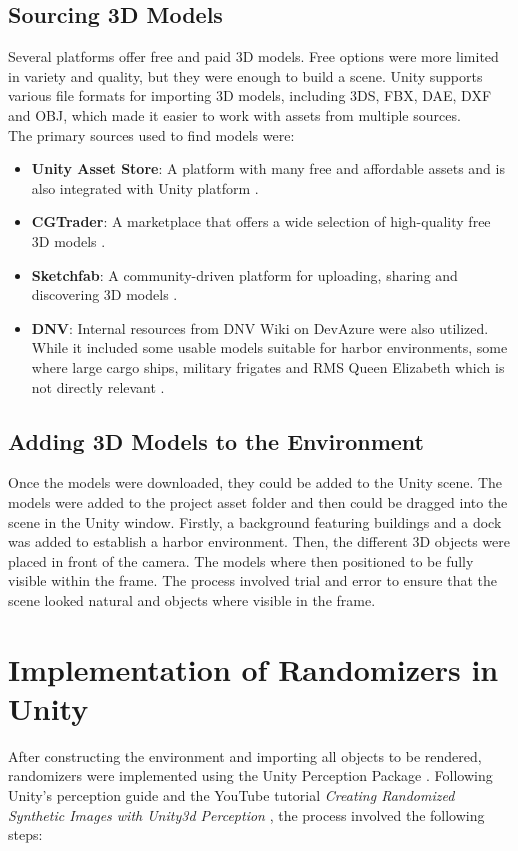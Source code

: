 \subsection{Sourcing 3D Models}
Several platforms offer free and paid 3D models. Free options were more limited in variety and quality, but they were enough to build a scene. Unity supports various file formats for importing 3D models, including 3DS, FBX, DAE, DXF and OBJ, which made it easier to work with assets from multiple sources. \\
\noindent The primary sources used to find models were:
\begin{itemize}
\item \textbf{Unity Asset Store}: A platform with many free and affordable assets and is also integrated with Unity platform \cite{UnityAssetStore}.
\item \textbf{CGTrader}: A marketplace that offers a wide selection of high-quality free 3D models \cite{cgtrader}.
\item \textbf{Sketchfab}: A community-driven platform for uploading, sharing and discovering 3D models \cite{sketchfab}.
\item \textbf{DNV}: Internal resources from DNV Wiki on DevAzure were also utilized. While it included some usable models suitable for harbor environments, some where large cargo ships, military frigates and RMS Queen Elizabeth which is not directly relevant \cite{dnv_wiki}.

\end{itemize}

\subsection{Adding 3D Models to the Environment}
Once the models were downloaded, they could be added to the Unity scene. The models were added to the project asset folder and then could be dragged into the scene in the Unity window. Firstly, a background featuring buildings and a dock was added to establish a harbor environment. Then, the different 3D objects were placed in front of the camera. The models where then positioned to be fully visible within the frame. The process involved trial and error to ensure that the scene looked natural and objects where visible in the frame.


\section{Implementation of Randomizers in Unity}
\label{section:Implementation of Randomizers in Unity}
After constructing the environment and importing all objects to be rendered, randomizers were implemented using the Unity Perception Package \cite{unity-perception2022}. Following Unity's perception guide \cite{unity-perception2022} and the YouTube tutorial \textit{Creating Randomized Synthetic Images with Unity3d Perception} \cite{secrets_of_apagayo_island_video}, the process involved the following steps:

